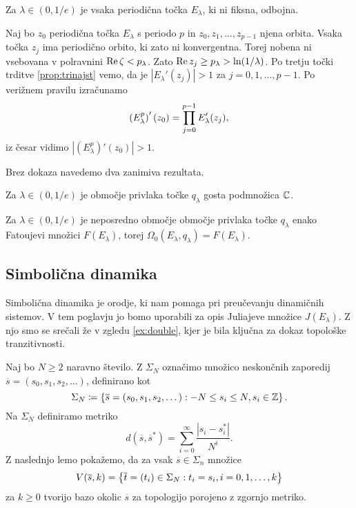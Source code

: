 \begin{posledica}
    Za \(\lambda \in (0, 1/e)\) je vsaka periodična točka \(E_\lambda\), ki ni fiksna, odbojna.
\end{posledica}

\begin{dokaz}
    Naj bo \(z_0\) periodična točka \(E_\lambda\) s periodo \(p\) in \(z_0, z_1, \dots, z_{p - 1}\) njena orbita. Vsaka točka \(z_j\) ima periodično orbito, ki zato ni konvergentna. Torej nobena ni vsebovana v polravnini \(\operatorname{Re} \zeta < p_\lambda\). Zato \(\operatorname{Re} z_j \geq p_\lambda > \ln (1 / \lambda)\). Po tretju točki trditve \ref{prop:trinajst} vemo, da je \(|E_\lambda' (z_j)| > 1\) za \(j = 0, 1, \dots, p - 1\). Po verižnem pravilu izračunamo
    \[\left( E_\lambda^p \right)' (z_0) = \prod_{j = 0}^{p - 1} E_\lambda' (z_j),\]
    iz česar vidimo \(|(E_\lambda^p)' (z_0)| > 1\).
\end{dokaz}

Brez dokaza navedemo dva zanimiva rezultata.

\begin{trditev}
    Za \(\lambda \in (0, 1/e)\) je območje privlaka točke \(q_\lambda\) gosta podmnožica \(\mathbb C\).
\end{trditev}

\begin{izrek}
    Za \(\lambda \in (0, 1/e)\) je neposredno območje območje privlaka točke \(q_\lambda\) enako Fatoujevi množici \(F (E_\lambda)\), torej \(\Omega_0 (E_\lambda, q_\lambda) = F (E_\lambda)\).
\end{izrek}

\subsection{Simbolična dinamika}

Simbolična dinamika je orodje, ki nam pomaga pri preučevanju dinamičnih sistemov. V tem poglavju jo bomo uporabili za opis Juliajeve množice \(J (E_\lambda)\). Z njo smo se srečali že v zgledu \ref{ex:double}, kjer je bila ključna za dokaz topološke tranzitivnosti.

Naj bo \(N \geq 2\) naravno število. Z \(\Sigma_N\) označimo množico neskončnih zaporedij \(\overline{s} = (s_0, s_1, s_2, \dots)\), definirano kot
\[\Sigma_N \coloneq \left\{ \overline{s} = (s_0, s_1, s_2, \dots) : - N \leq s_i \leq N, s_i \in \mathbb Z \right\}.\]
Na \(\Sigma_N\) definiramo metriko
\[d (\overline{s}, \overline{s}^*) = \sum_{i = 0}^{\infty} \frac{|s_i - s_i^*|}{N^i}.\]
Z naslednjo lemo pokažemo, da za vsak \(\overline{s} \in \Sigma_n\) množice
\[V(\overline{s}, k) = \left\{ \overline{t} = (t_i) \in \Sigma_N : t_i = s_i, i = 0, 1, \dots, k \right\}\]
za \(k \geq 0\) tvorijo bazo okolic \(\overline{s}\) za topologijo porojeno z zgornjo metriko.

